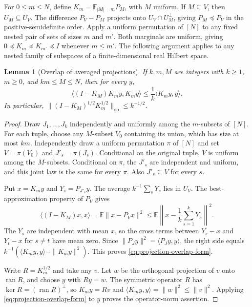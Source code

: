 \documentclass[11pt]{article}
\newtheorem{lemma}[theorem]{Lemma}
\theoremstyle{definition}\newtheorem{definition}[theorem]{Definition}
\begin{document}
For $0\leq m\leq N$, define $K_m=\mathbb E_{|M|=m}P_M$, with $M$ uniform.
If $M\subseteq V$, then $U_M\subseteq U_V$. The difference $P_V-P_M$
projects onto $U_V\cap U_M^\perp$, giving $P_M\preceq P_V$ in the
positive-semidefinite order. Apply a uniform permutation of $[N]$ to any fixed
nested pair of sets of sizes $m$ and $m'$. Both marginals are uniform, giving
$0\preceq K_m\preceq K_{m'}\preceq I$ whenever $m\leq m'$. The following
argument applies to any nested family of subspaces of a finite-dimensional
real Hilbert space.

\begin{lemma}[Overlap of averaged projections]
\label{lem:projection-overlap}
If $k,m,M$ are integers with $k\geq1$, $m\geq0$, and $km\leq M\leq N$,
then for every $y$,
\begin{equation}
  \label{eq:projection-overlap-form}
  \big\langle(I-K_M)K_my,K_my\big\rangle
  \leq \frac{1}{k}\langle K_my,y\rangle.
\end{equation}
In particular, $\|(I-K_M)^{1/2}K_m^{1/2}\|_{\mathrm{op}}\leq k^{-1/2}$.
\end{lemma}

\begin{proof}
Draw $J_1,\ldots,J_k$ independently and uniformly among the $m$-subsets
of $[N]$. For each tuple, choose any $M$-subset $V_0$ containing its union,
which has size at most $km$. Independently draw a uniform permutation $\pi$
of $[N]$ and set $V=\pi(V_0)$ and $J'_s=\pi(J_s)$. Conditional on the
original tuple, $V$ is uniform among the $M$-subsets. Conditional on $\pi$,
the $J'_s$ are independent and uniform, and this joint law is the same for
every $\pi$. Also $J'_s\subseteq V$ for every $s$.

Put $x=K_my$ and $Y_s=P_{J'_s}y$. The average $k^{-1}\sum_s Y_s$ lies in
$U_V$. The best-approximation property of $P_V$ gives
\[
  \langle(I-K_M)x,x\rangle
  =\mathbb E\|x-P_Vx\|^2
  \leq\mathbb E\left\|x-\frac1k\sum_{s=1}^kY_s\right\|^2.
\]
The $Y_s$ are independent with mean $x$, so the cross terms between
$Y_s-x$ and $Y_t-x$ for $s\ne t$ have mean zero. Since
$\|P_Jy\|^2=\langle P_Jy,y\rangle$, the right side equals
$k^{-1}(\langle K_my,y\rangle-\|K_my\|^2)$. This proves
\eqref{eq:projection-overlap-form}.

Write $R=K_m^{1/2}$ and take any $v$. Let $w$ be the orthogonal projection
of $v$ onto $\operatorname{ran}R$, and choose $y$ with $Ry=w$. The symmetric
operator $R$ has $\ker R=(\operatorname{ran}R)^\perp$, so $K_my=Rv$ and
$\langle K_my,y\rangle=\|w\|^2\leq\|v\|^2$. Applying
\eqref{eq:projection-overlap-form} to $y$ proves the operator-norm assertion.
\end{proof}
\end{document}
